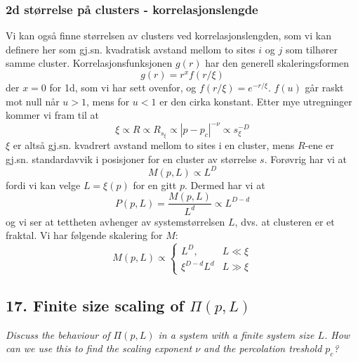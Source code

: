 \documentclass[english, a4paper]{article}
\begin{document}
\subsubsection{2d størrelse på clusters - korrelasjonslengde}
Vi kan også finne størrelsen av clusters ved korrelasjonslengden, som vi kan definere her
som gj.sn. kvadratisk avstand mellom to sites $i$ og $j$ som tilhører samme cluster. Korrelasjonsfunksjonen
$g(r)$ har den generell skaleringsformen
\begin{equation}
 g(r) = r^xf(r/\xi)
\end{equation}
der $x=0$ for 1d, som vi har sett ovenfor, og $f(r/\xi) = e^{-r/\xi}$. $f(u)$ går raskt mot null når
$u > 1$, mens for $u < 1$ er den cirka konstant. Etter mye utregninger kommer vi fram til at
\begin{equation}
 \xi \propto R \propto R_{s_\xi} \propto |p-p_c|^{-\nu} \propto s_\xi^{-D}
\end{equation}
$\xi$ er altså gj.sn. kvadrert avstand mellom to sites i en cluster, mens $R$-ene er gj.sn. standardavvik
i posisjoner for en cluster av størrelse $s$. Forøvrig har vi at
\begin{equation}
 M(p,L) \propto L^D
\end{equation}
fordi vi kan velge $L = \xi(p)$ for en gitt $p$. Dermed har vi at
\begin{equation}
 P(p,L) = \frac{M(p,L)}{L^d} \propto L^{D-d}
\end{equation}
og vi ser at tettheten avhenger av systemstørrelsen $L$, dvs. at clusteren er et fraktal. 
Vi har følgende skalering for $M$:
\begin{equation}
M(p,L) \propto
\begin{cases}
 L^D, & L \ll \xi \\
 \xi^{D-d} L^d & L \gg \xi
\end{cases}
\end{equation}


\subsection{ 17. Finite size scaling of $\Pi(p,L)$ }
\textit{Discuss the behaviour of $\Pi(p,L)$ in a system with a finite system size $L$. 
How can we use this to find the scaling exponent $\nu$ and the percolation treshold $p_c$?}\\
\end{document}
